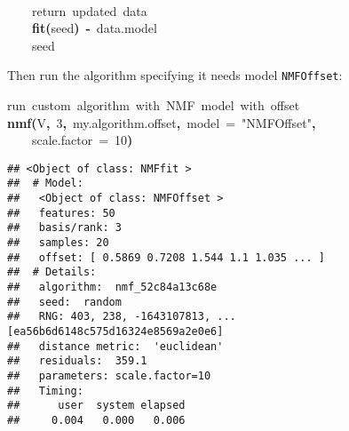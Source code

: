\documentclass[a4paper]{article}\usepackage{graphicx, color}
\makeatletter
\newcommand{\hlnumber}[1]{\textcolor[rgb]{0,0,0}{#1}}%
\newcommand{\hlfunctioncall}[1]{\textcolor[rgb]{0.501960784313725,0,0.329411764705882}{\textbf{#1}}}%
\newcommand{\hlstring}[1]{\textcolor[rgb]{0.6,0.6,1}{#1}}%
\newcommand{\hlkeyword}[1]{\textcolor[rgb]{0,0,0}{\textbf{#1}}}%
\newcommand{\hlargument}[1]{\textcolor[rgb]{0.690196078431373,0.250980392156863,0.0196078431372549}{#1}}%
\newcommand{\hlcomment}[1]{\textcolor[rgb]{0.180392156862745,0.6,0.341176470588235}{#1}}%
\newcommand{\hlassignement}[1]{\textcolor[rgb]{0,0,0}{\textbf{#1}}}%
\newcommand{\hlsymbol}[1]{\textcolor[rgb]{0,0,0}{#1}}%
\newcommand{\hlstd}[1]{\textcolor[rgb]{0,0,0}{#1}}%
\newenvironment{kframe}{%
 \def\FrameCommand##1{\hskip\@totalleftmargin \hskip-\fboxsep
 \colorbox{shadecolor}{##1}\hskip-\fboxsep
     \hskip-\linewidth \hskip-\@totalleftmargin \hskip\columnwidth}%
 \MakeFramed {\advance\hsize-\width
   \@totalleftmargin\z@ \linewidth\hsize
   \@setminipage}}%
 {\par\unskip\endMakeFramed}
\newenvironment{knitrout}{}{} %
\let\code=\texttt
\makeatother
\begin{document}
\begin{knitrout}
\begin{kframe}
\begin{flushleft}
\hlstd{}\hspace*{\fill}\\
\hlstd{}{\ }{\ }{\ }{\ }\hlcomment{\usebox{\hlnormalsizeboxhash}{\ }return{\ }updated{\ }data}\hspace*{\fill}\\
\hlstd{}{\ }{\ }{\ }{\ }\hlfunctioncall{fit}\hlkeyword{(}\hlsymbol{seed}\hlkeyword{)}{\ }\hlassignement{\usebox{\hlnormalsizeboxlessthan}-}{\ }\hlsymbol{data.model}\hspace*{\fill}\\
\hlstd{}{\ }{\ }{\ }{\ }\hlsymbol{seed}\hspace*{\fill}\\
\hlstd{}\hlkeyword{\usebox{\hlnormalsizeboxclosebrace}}\mbox{}
\normalfont
\end{flushleft}
\end{kframe}
\end{knitrout}


Then run the algorithm specifying it needs model \code{NMFOffset}:
\begin{knitrout}
\color{fgcolor}\begin{kframe}
\begin{flushleft}
\ttfamily\noindent
\hlcomment{\usebox{\hlnormalsizeboxhash}{\ }run{\ }custom{\ }algorithm{\ }with{\ }NMF{\ }model{\ }with{\ }offset}\hspace*{\fill}\\
\hlstd{}\hlfunctioncall{nmf}\hlkeyword{(}\hlsymbol{V}\hlkeyword{,}{\ }\hlnumber{3}\hlkeyword{,}{\ }\hlsymbol{my.algorithm.offset}\hlkeyword{,}{\ }\hlargument{model}{\ }\hlargument{=}{\ }\hlstring{"{}NMFOffset"{}}\hlkeyword{,}\hspace*{\fill}\\
\hlstd{}{\ }{\ }{\ }{\ }\hlargument{scale.factor}{\ }\hlargument{=}{\ }\hlnumber{10}\hlkeyword{)}\mbox{}
\normalfont
\end{flushleft}
\begin{verbatim}
## <Object of class: NMFfit >
##  # Model:
##   <Object of class: NMFOffset >
##   features: 50 
##   basis/rank: 3 
##   samples: 20 
##   offset: [ 0.5869 0.7208 1.544 1.1 1.035 ... ]
##  # Details:
##   algorithm:  nmf_52c84a13c68e 
##   seed:  random 
##   RNG: 403, 238, -1643107813, ... [ea56b6d6148c575d16324e8569a2e0e6]
##   distance metric:  'euclidean' 
##   residuals:  359.1 
##   parameters: scale.factor=10 
##   Timing:
##      user  system elapsed 
##     0.004   0.000   0.006 
\end{verbatim}
\end{kframe}
\end{knitrout}
\end{document}
